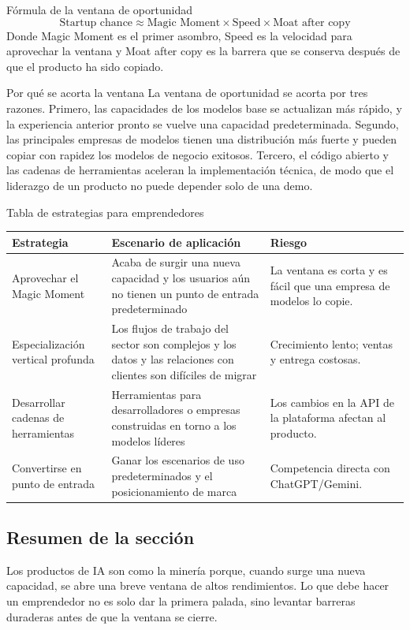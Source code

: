 \begin{importantbox}{Fórmula de la ventana de oportunidad}
\[
\text{Startup chance} \approx \text{Magic Moment} \times \text{Speed} \times \text{Moat after copy}
\]
Donde Magic Moment es el primer asombro, Speed es la velocidad para aprovechar la ventana y Moat after copy es la barrera que se conserva después de que el producto ha sido copiado.
\end{importantbox}

\begin{knowledgebox}{Por qué se acorta la ventana}
La ventana de oportunidad se acorta por tres razones. Primero, las capacidades de los modelos base se actualizan más rápido, y la experiencia anterior pronto se vuelve una capacidad predeterminada. Segundo, las principales empresas de modelos tienen una distribución más fuerte y pueden copiar con rapidez los modelos de negocio exitosos. Tercero, el código abierto y las cadenas de herramientas aceleran la implementación técnica, de modo que el liderazgo de un producto no puede depender solo de una demo.
\end{knowledgebox}

\begin{knowledgebox}{Tabla de estrategias para emprendedores}
\begin{tabularx}{\textwidth}{p{}p{}X}
\toprule
Estrategia & Escenario de aplicación & Riesgo \\
\midrule
Aprovechar el Magic Moment & Acaba de surgir una nueva capacidad y los usuarios aún no tienen un punto de entrada predeterminado & La ventana es corta y es fácil que una empresa de modelos lo copie. \\
Especialización vertical profunda & Los flujos de trabajo del sector son complejos y los datos y las relaciones con clientes son difíciles de migrar & Crecimiento lento; ventas y entrega costosas. \\
Desarrollar cadenas de herramientas & Herramientas para desarrolladores o empresas construidas en torno a los modelos líderes & Los cambios en la API de la plataforma afectan al producto. \\
Convertirse en punto de entrada & Ganar los escenarios de uso predeterminados y el posicionamiento de marca & Competencia directa con ChatGPT/Gemini. \\
\bottomrule
\end{tabularx}
\end{knowledgebox}

\subsection{Resumen de la sección}

Los productos de IA son como la minería porque, cuando surge una nueva capacidad, se abre una breve ventana de altos rendimientos. Lo que debe hacer un emprendedor no es solo dar la primera palada, sino levantar barreras duraderas antes de que la ventana se cierre.
